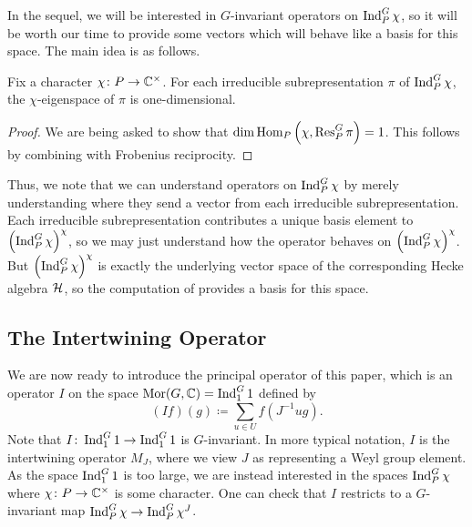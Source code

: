 In the sequel, we will be interested in $G$-invariant operators on $\operatorname{Ind}^G_P\chi$, so it will be worth our time to provide some vectors which will behave like a basis for this space. The main idea is as follows.
\begin{lemma} \label{lem:basis-of-ind}
	Fix a character $\chi\colon P\to\mathbb C^\times$. For each irreducible subrepresentation $\pi$ of $\operatorname{Ind}^G_P\chi$, the $\chi$-eigenspace of $\pi$ is one-dimensional.
\end{lemma}
\begin{proof}
	We are being asked to show that $\dim\operatorname{Hom}_P\left(\chi,\operatorname{Res}^G_P\pi\right)=1$. This follows by combining  with Frobenius reciprocity.
\end{proof}
Thus, we note that we can understand operators on $\operatorname{Ind}^G_P\chi$ by merely understanding where they send a vector from each irreducible subrepresentation. Each irreducible subrepresentation contributes a unique basis element to $\left(\operatorname{Ind}^G_P\chi\right)^\chi$, so we may just understand how the operator behaves on $\left(\operatorname{Ind}^G_P\chi\right)^\chi$. But $\left(\operatorname{Ind}^G_P\chi\right)^\chi$ is exactly the underlying vector space of the corresponding Hecke algebra $\mathcal{H}$, so the computation of  provides a basis for this space. %

\subsection{The Intertwining Operator}
We are now ready to introduce the principal operator of this paper, which is an operator $I$ on the space $\operatorname{Mor}(G,\mathbb C)=\operatorname{Ind}^G_11$ defined by
\[(If)(g)\coloneqq\sum_{u\in U}f\left(J^{-1}ug\right).\]
Note that $I\colon\operatorname{Ind}^G_11\to\operatorname{Ind}^G_11$ is $G$-invariant. In more typical notation, $I$ is the intertwining operator $M_J$, where we view $J$ as representing a Weyl group element. As the space $\operatorname{Ind}^G_11$ is too large, we are instead interested in the spaces $\operatorname{Ind}_P^G\chi$ where $\chi\colon P\to\mathbb C^\times$ is some character. One can check that $I$ restricts to a $G$-invariant map $\operatorname{Ind}_P^G\chi\to\operatorname{Ind}_P^G\chi^J$.

